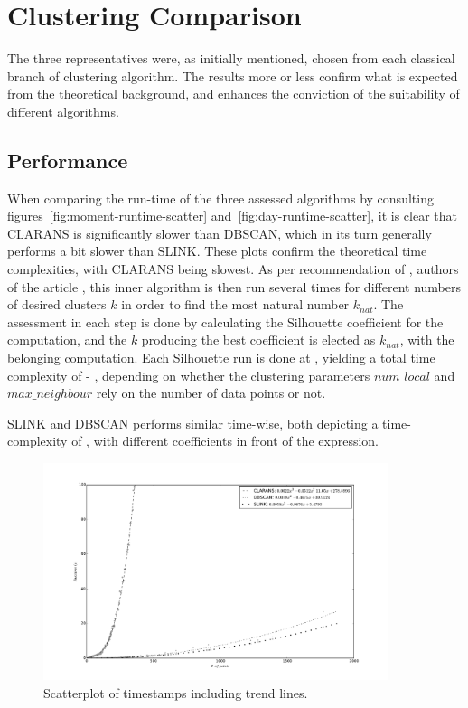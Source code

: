 
\section{Clustering Comparison}
The three representatives were, as initially mentioned, chosen from each 
classical branch of clustering algorithm. The results more or less confirm
what is expected from the theoretical background, and enhances the 
conviction of the suitability of different algorithms.

\subsection{Performance}
When comparing the run-time of the three assessed algorithms by 
consulting figures~\ref{fig:moment-runtime-scatter} 
and~\ref{fig:day-runtime-scatter}, it is clear that CLARANS is 
significantly slower than DBSCAN, which in its turn generally
performs a bit slower than SLINK. These plots confirm the theoretical time 
complexities, with CLARANS being slowest.
As per recommendation of \citeauthor{CLARANS},
authors of the article , this 
inner algorithm is then run several times for different numbers of desired 
clusters $k$ in order to find the most natural number $k_{nat}$. The 
assessment in each step is done by calculating the Silhouette coefficient 
for the computation, and the $k$ producing the best coefficient is elected 
as $k_{nat}$, with the belonging computation. Each Silhouette run is done 
at , yielding a total time complexity of  - ,
depending on whether the clustering parameters $num\_local$ and $max\_neighbour$
rely on the number of data points or not. 

SLINK and DBSCAN performs similar time-wise, both depicting a 
time-complexity of , with different coefficients in front of the 
expression. 

\begin{figure}[ht]
    \centering
    \includegraphics[width=0.9\textwidth]{plots/time_trendlines.pdf}
    \caption{Scatterplot of timestamps including trend lines.
    \label{fig:time-trendlines} }
\end{figure}

